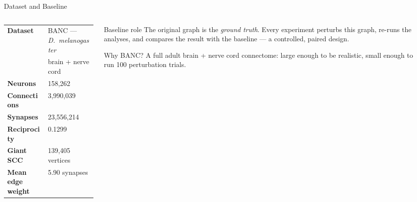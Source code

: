 \documentclass[aspectratio=169,11pt]{beamer}
\begin{document}
\begin{frame}{Dataset and Baseline}
\begin{columns}[c]
  \begin{column}{0.55\textwidth}
    \footnotesize\renewcommand{\arraystretch}{1.6}
    \begin{tabular}{@{}ll@{}}
      \toprule
      \textbf{Dataset} & BANC --- \emph{D.~melanogaster}\\
                       & brain + nerve cord\\
      \midrule
      \textbf{Neurons} & 158{,}262\\
      \textbf{Connections} & 3{,}990{,}039\\
      \textbf{Synapses} & 23{,}556{,}214\\
      \midrule
      \textbf{Reciprocity} & 0.1299\\
      \textbf{Giant SCC} & 139{,}405 vertices\\
      \textbf{Mean edge weight} & 5.90 synapses\\
      \bottomrule
    \end{tabular}
  \end{column}
  \begin{column}{0.42\textwidth}
    \begin{block}{Baseline role}
      \small
      The original graph is the \emph{ground truth}.  Every experiment
      perturbs this graph, re-runs the analyses, and compares the result
      with the baseline --- a controlled, paired design.
    \end{block}
    \begin{block}{Why BANC?}
      \small
      A full adult brain + nerve cord connectome: large enough to be
      realistic, small enough to run 100 perturbation trials.
    \end{block}
  \end{column}
\end{columns}
\end{frame}
\end{document}
